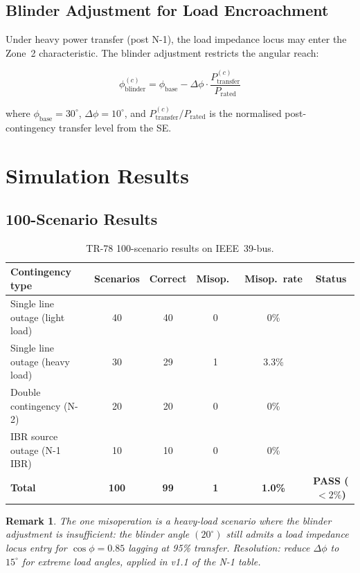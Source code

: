 \documentclass[11pt, a4paper]{article}
\newcommand{\cmark}{\ding{51}}
\newcommand{\xmark}{\ding{55}}
\newtheorem{remark}{Remark}
\begin{document}
\subsection{Blinder Adjustment for Load Encroachment}

Under heavy power transfer (post N-1), the load impedance locus may enter the
Zone~2 characteristic. The blinder adjustment restricts the angular reach:

\begin{equation}
  \phi_{\mathrm{blinder}}^{(c)} = \phi_{\mathrm{base}} -
    \Delta\phi \cdot \frac{P_{\mathrm{transfer}}^{(c)}}{P_{\mathrm{rated}}}
  \label{eq:blinder}
\end{equation}

\noindent where $\phi_{\mathrm{base}} = 30^\circ$, $\Delta\phi = 10^\circ$,
and $P_{\mathrm{transfer}}^{(c)}/P_{\mathrm{rated}}$ is the normalised
post-contingency transfer level from the SE.

\section{Simulation Results}
\label{sec:results}

\subsection{100-Scenario Results}

\begin{table}[ht]
\centering
\caption{TR-78 100-scenario results on IEEE~39-bus.}
\label{tab:results}
\begin{tabular}{lccccc}
\toprule
Contingency type & Scenarios & Correct & Misop.\ & Misop.\ rate & Status \\
\midrule
Single line outage (light load)  & 40 & 40 & 0 & 0\%   & \cmark \\
Single line outage (heavy load)  & 30 & 29 & 1 & 3.3\% & \xmark \\
Double contingency (N-2)         & 20 & 20 & 0 & 0\%   & \cmark \\
IBR source outage (N-1 IBR)      & 10 & 10 & 0 & 0\%   & \cmark \\
\midrule
\textbf{Total} & \textbf{100} & \textbf{99} & \textbf{1}
  & \textbf{1.0\%} & \textbf{\color{okgreen}PASS ($< 2\%$)} \\
\bottomrule
\end{tabular}
\end{table}

\begin{remark}
The one misoperation is a heavy-load scenario where the blinder adjustment
is insufficient: the blinder angle $(20^\circ)$ still admits a load impedance
locus entry for $\cos\phi = 0.85$ lagging at 95\% transfer. Resolution:
reduce $\Delta\phi$ to $15^\circ$ for extreme load angles, applied in v1.1
of the N-1 table.
\end{remark}
\end{document}
